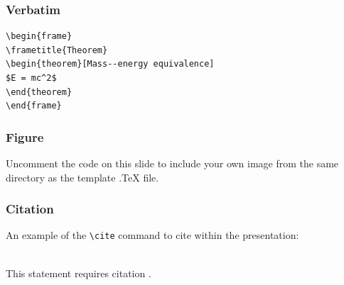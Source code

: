 \begin{frame}[fragile] %
\frametitle{Verbatim}
\begin{example}
\begin{verbatim}
\begin{frame}
\frametitle{Theorem}
\begin{theorem}[Mass--energy equivalence]
$E = mc^2$
\end{theorem}
\end{frame}\end{verbatim}
\end{example}
\end{frame}


\begin{frame}
\frametitle{Figure}
Uncomment the code on this slide to include your own image from the same directory as the template .TeX file.
\end{frame}


\begin{frame}[fragile] %
\frametitle{Citation}
An example of the \verb|\cite| command to cite within the presentation:\\~

This statement requires citation \cite{p1}.
\end{frame}




%     
%









